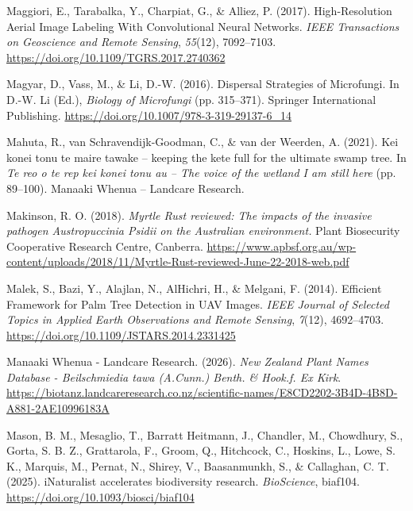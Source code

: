 \documentclass[
]{scrreprt}
\newlength{\cslhangindent}
\newenvironment{CSLReferences}[2] %
 {\begin{list}{}{%
  \setlength{\itemindent}{0pt}
  \setlength{\leftmargin}{0pt}
  \setlength{\parsep}{0pt}
  \setlength{\baselineskip}{12pt}
  \ifodd #1
   \setlength{\leftmargin}{\cslhangindent}
   \setlength{\itemindent}{-1\cslhangindent}
  \fi
  \setlength{\itemsep}{4pt}}}
 {\end{list}}
\begin{document}
\begin{CSLReferences}{1}{0}
Maggiori, E., Tarabalka, Y., Charpiat, G., \& Alliez, P. (2017).
High-{Resolution Aerial Image Labeling With Convolutional Neural
Networks}. \emph{IEEE Transactions on Geoscience and Remote Sensing},
\emph{55}(12), 7092--7103.
\url{https://doi.org/10.1109/TGRS.2017.2740362}

Magyar, D., Vass, M., \& Li, D.-W. (2016). Dispersal {Strategies} of
{Microfungi}. In D.-W. Li (Ed.), \emph{Biology of {Microfungi}} (pp.
315--371). Springer International Publishing.
\url{https://doi.org/10.1007/978-3-319-29137-6_14}

Mahuta, R., van Schravendijk-Goodman, C., \& van der Weerden, A. (2021).
Kei konei tonu te maire tawake -- keeping the kete full for the ultimate
swamp tree. In \emph{Te reo o te rep kei konei tonu au -- {The} voice of
the wetland {I} am still here} (pp. 89--100). Manaaki Whenua -- Landcare
Research.

Makinson, R. O. (2018). \emph{Myrtle {Rust} reviewed: The impacts of the
invasive pathogen {\emph{Austropuccinia}}{ \emph{Psidii}} on the
{Australian} environment.} Plant Biosecurity Cooperative Research
Centre, Canberra.
\url{https://www.apbsf.org.au/wp-content/uploads/2018/11/Myrtle-Rust-reviewed-June-22-2018-web.pdf}

Malek, S., Bazi, Y., Alajlan, N., AlHichri, H., \& Melgani, F. (2014).
Efficient {Framework} for {Palm Tree Detection} in {UAV Images}.
\emph{IEEE Journal of Selected Topics in Applied Earth Observations and
Remote Sensing}, \emph{7}(12), 4692--4703.
\url{https://doi.org/10.1109/JSTARS.2014.2331425}

Manaaki Whenua - Landcare Research. (2026). \emph{New {Zealand Plant
Names Database} - {Beilschmiedia} tawa ({A}.{Cunn}.) {Benth}. \&
{Hook}.f. Ex {Kirk}}.
\url{https://biotanz.landcareresearch.co.nz/scientific-names/E8CD2202-3B4D-4B8D-A881-2AE10996183A}

Mason, B. M., Mesaglio, T., Barratt Heitmann, J., Chandler, M.,
Chowdhury, S., Gorta, S. B. Z., Grattarola, F., Groom, Q., Hitchcock,
C., Hoskins, L., Lowe, S. K., Marquis, M., Pernat, N., Shirey, V.,
Baasanmunkh, S., \& Callaghan, C. T. (2025). {iNaturalist} accelerates
biodiversity research. \emph{BioScience}, biaf104.
\url{https://doi.org/10.1093/biosci/biaf104}


\end{CSLReferences}
\end{document}
